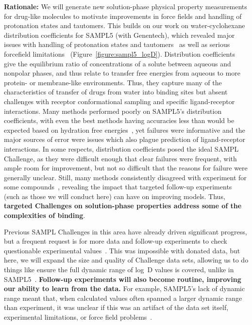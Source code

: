 \documentclass[11pt]{article}
\begin{document}
{\bf Rationale:}
We will generate new solution-phase physical property measurements for drug-like molecules to motivate improvements in force fields and handling of protonation states and tautomers.
This builds on our work on water-cyclohexane distribution coefficients for SAMPL5 (with Genentech), which revealed major issues with handling of protonation states and tautomers~\cite{Bannan:2016:JComputAidedMolDes} as well as serious forcefield limitations~\cite{paranahewage_predicting_2016} (Figure~\ref{figure:sampl5_logD}).
Distribution coefficients give the equilibrium ratio of concentrations of a solute between aqueous and nonpolar phases, and thus relate to transfer free energies from aqueous to more protein- or membrane-like environments.
Thus, they capture many of the characteristics of transfer of drugs from water into binding sites but absent challenges with receptor conformational sampling and specific ligand-receptor interactions.
Many methods performed poorly on SAMPL5's distribution coefficients, with even the best methods having accuracies less than would be expected based on hydration free energies~\cite{Bannan:2016:JComputAidedMolDes}, yet failures were informative and the major sources of error were issues which also plague prediction of ligand-receptor interactions.
In some respects, distribution coefficients posed the ideal SAMPL Challenge, as they were difficult enough that clear failures were frequent, with ample room for improvement, but not so difficult that the reasons for failure were generally unclear. 
Still, many methods consistently disagreed with experiment for some compounds~\cite{paranahewage_predicting_2016, klamt_prediction_2016, Bannan:2016:JComputAidedMolDes, rustenburg_measuring_2016}, revealing the impact that targeted follow-up experiments (such as those we will conduct here) can have on improving models.
Thus, \textbf{targeted Challenges on solution-phase properties address some of the complexities of binding}.  

Previous SAMPL Challenges in this area have already driven significant progress, but a frequent request is for more data and follow-up experiments to check questionable experimental values~\cite{Mobley:2017:eScholarship}. 
This was impossible with donated data, but here, we will expand the size and quality of Challenge data sets, allowing us to do things like ensure the full dynamic range of log~D values is covered, unlike in SAMPL5~\cite{rustenburg_measuring_2016, Bannan:2016:JComputAidedMolDes}. 
\textbf{Follow-up experiments will also become routine, improving our ability to learn from the data.}
For example, SAMPL5's lack of dynamic range meant that, when calculated values often spanned a larger dynamic range than experiment, it was unclear if this was an artifact of the data set itself, experimental limitations, or force field problems~\cite{rustenburg_measuring_2016, Bannan:2016:JComputAidedMolDes, paranahewage_predicting_2016, klamt_prediction_2016}.  
\end{document}
